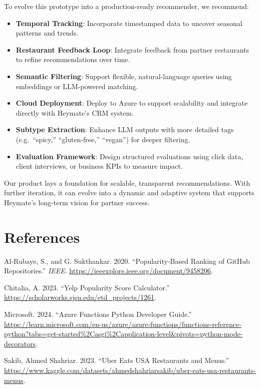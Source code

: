 \documentclass[
  11pt,
  a4paper,
  DIV=11,
  numbers=noendperiod]{scrartcl}
\providecommand{\tightlist}{%
  \setlength{\itemsep}{0pt}\setlength{\parskip}{0pt}}\usepackage{longtable,booktabs,array}
\newlength{\cslhangindent}
\newenvironment{CSLReferences}[2] %
 {\begin{list}{}{%
  \setlength{\itemindent}{0pt}
  \setlength{\leftmargin}{0pt}
  \setlength{\parsep}{0pt}
  \ifodd #1
   \setlength{\leftmargin}{\cslhangindent}
   \setlength{\itemindent}{-1\cslhangindent}
  \fi
  \setlength{\itemsep}{#2\baselineskip}}}
 {\end{list}}
\begin{document}
To evolve this prototype into a production-ready recommender, we
recommend:

\begin{itemize}
\tightlist
\item
  \textbf{Temporal Tracking}: Incorporate timestamped data to uncover
  seasonal patterns and trends.
\item
  \textbf{Restaurant Feedback Loop}: Integrate feedback from partner
  restaurants to refine recommendations over time.
\item
  \textbf{Semantic Filtering}: Support flexible, natural-language
  queries using embeddings or LLM-powered matching.
\item
  \textbf{Cloud Deployment}: Deploy to Azure to support scalability and
  integrate directly with Heymate's CRM system.
\item
  \textbf{Subtype Extraction}: Enhance LLM outputs with more detailed
  tags (e.g.~``spicy,'' ``gluten-free,'' ``vegan'') for deeper
  filtering.
\item
  \textbf{Evaluation Framework}: Design structured evaluations using
  click data, client interviews, or business KPIs to measure impact.
\end{itemize}

Our product lays a foundation for scalable, transparent recommendations.
With further iteration, it can evolve into a dynamic and adaptive system
that supports Heymate's long-term vision for partner success.

\newpage{}

\section*{References}\label{references}

\label{refs}
\begin{CSLReferences}{1}{0}
Al-Rubaye, S., and G. Sukthankar. 2020. {``Popularity-Based Ranking of
GitHub Repositories.''} \emph{IEEE}.
\url{https://ieeexplore.ieee.org/document/9458206}.

Chitalia, A. 2023. {``Yelp Popularity Score Calculator.''}
\url{https://scholarworks.sjsu.edu/etd_projects/1261}.

Microsoft. 2024. {``Azure Functions Python Developer Guide.''}
\url{https://learn.microsoft.com/en-us/azure/azure-functions/functions-reference-python?tabs=get-started\%2Casgi\%2Capplication-level&pivots=python-mode-decorators}.

Sakib, Ahmed Shahriar. 2023. {``Uber Eats USA Restaurants and Menus.''}
\url{https://www.kaggle.com/datasets/ahmedshahriarsakib/uber-eats-usa-restaurants-menus}.

\end{CSLReferences}
\end{document}
